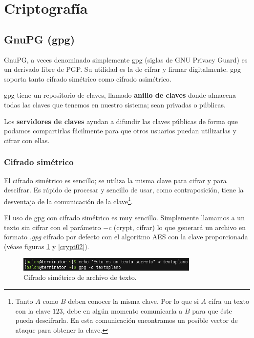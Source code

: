 \documentclass[a4paper, 11pt, titlepage]{book}
\begin{document}
    \section{Criptografía}

        \subsection{GnuPG (gpg)}
    
            GnuPG, a veces denominado simplemente gpg (siglas de GNU Privacy Guard) es un derivado libre
            de PGP. Su utilidad es la de cifrar y firmar digitalmente. gpg soporta tanto cifrado simétrico 
            como cifrado asimétrico.
    
            gpg tiene un repositorio de claves, llamado \textbf{anillo de claves} 
            donde almacena todas las claves que tenemos en nuestro sistema; sean privadas o públicas.
    
            Los \textbf{servidores de claves} ayudan a difundir las claves públicas 
            de forma que podamos compartirlas fácilmente para que otros usuarios puedan utilizarlas y
            cifrar con ellas.
    
            \subsubsection{Cifrado simétrico}
    
                El cifrado simétrico es sencillo; se utiliza la misma clave para cifrar y para descifrar.
                Es rápido de procesar y sencillo de usar, como contraposición, tiene la desventaja de la 
                comunicación de la clave\footnote{
                    Tanto $A$ como $B$ deben conocer la misma clave. Por lo que si $A$ cifra un texto con
                    la clave $123$, debe en algún momento comunicarla a $B$ para que éste pueda descifrarla.
                    En esta comunicación encontramos un posible vector de ataque para obtener la clave.
                }.
    
                El uso de gpg con cifrado simétrico es muy sencillo. Simplemente llamamos a un texto sin cifrar
                con el parámetro $-c$ (crypt, cifrar) lo que generará un archivo en formato \textit{.gpg} cifrado
                por defecto con el algoritmo AES con la clave proporcionada (véase figuras \ref{crypt01} y 
                \ref{crypt02}).
    
                \begin{figure}[htp]
                    \centering
                    \includegraphics[width=0.8\textwidth]{resources/crypt01.png}
                    \caption{Cifrado simétrico de archivo de texto.}
                    \label{crypt01}
                \end{figure}
    
\end{document}
